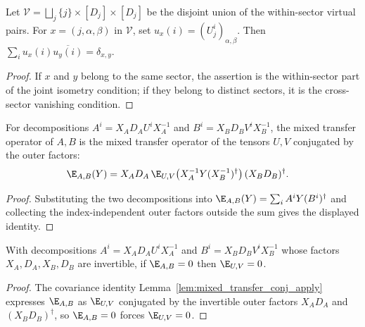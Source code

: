 \begin{lemma}%
    \label{thm:residual_isometry_family_one_gram}
    \leanok
    Let $\mathcal V=\bigsqcup_j\{j\}\times[D_j]\times[D_j]$ be the disjoint
    union of the within-sector virtual pairs. For $x=(j,\alpha,\beta)$ in
    $\mathcal V$, set $u_x(i)=(U_j^i)_{\alpha,\beta}$. Then
    $\sum_i u_x(i)\overline{u_y(i)}=\delta_{x,y}$.
\end{lemma}

\begin{proof}\leanok
    If $x$ and $y$ belong to the same sector, the assertion is the
    within-sector part of the joint isometry condition; if they belong to
    distinct sectors, it is the cross-sector vanishing condition.
\end{proof}

\begin{lemma}%
    \label{lem:mixed_transfer_conj_apply}
    \leanok
    For decompositions $A^i=X_AD_AU^iX_A^{-1}$ and
    $B^i=X_BD_BV^iX_B^{-1}$, the mixed transfer operator of $A,B$ is the
    mixed transfer operator of the tensors $U,V$ conjugated by the outer
    factors:
    \begin{align}
        \E_{A,B}(Y)
         & =X_AD_A\,\E_{U,V}\!\left(X_A^{-1}Y(X_B^{-1})^\dagger\right)(X_BD_B)^\dagger.
        \notag
    \end{align}
\end{lemma}
\begin{proof}\leanok
    Substituting the two decompositions into
    $\E_{A,B}(Y)=\sum_iA^iY(B^i)^\dagger$ and collecting the index-independent
    outer factors outside the sum gives the displayed identity.
\end{proof}

\begin{lemma}%
    \label{lem:mixed_transfer_eq_zero_of_conj}
    \leanok
    With decompositions $A^i=X_AD_AU^iX_A^{-1}$ and
    $B^i=X_BD_BV^iX_B^{-1}$ whose factors $X_A,D_A,X_B,D_B$ are
    invertible, if $\E_{A,B}=0$ then $\E_{U,V}=0$.
\end{lemma}
\begin{proof}\leanok
    The covariance identity Lemma~\ref{lem:mixed_transfer_conj_apply} expresses
    $\E_{A,B}$ as $\E_{U,V}$ conjugated by the invertible outer factors
    $X_AD_A$ and $(X_BD_B)^\dagger$, so $\E_{A,B}=0$ forces $\E_{U,V}=0$.
\end{proof}

